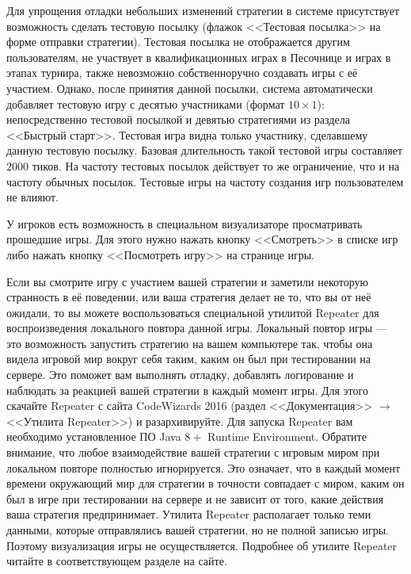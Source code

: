 Для упрощения отладки небольших изменений стратегии в системе присутствует возможность сделать тестовую посылку (флажок <<Тестовая посылка>>
на форме отправки стратегии). Тестовая посылка не отображается другим пользователям, не участвует в квалификационных играх в Песочнице и
играх в этапах турнира, также невозможно собственноручно создавать игры с её участием. Однако, после принятия данной посылки, система
автоматически добавляет тестовую игру с десятью участниками (формат $10\times1$): непосредственно тестовой посылкой и девятью стратегиями из
раздела <<Быстрый старт>>. Тестовая игра видна только участнику, сделавшему данную тестовую посылку. Базовая длительность такой тестовой
игры составляет $2000$ тиков. На частоту тестовых посылок действует то же ограничение, что и на частоту обычных посылок. Тестовые игры на
частоту создания игр пользователем не влияют.

У игроков есть возможность в специальном визуализаторе просматривать прошедшие игры. Для этого нужно нажать кнопку <<Смотреть>> в списке игр
либо нажать кнопку <<Посмотреть игру>> на странице игры.

Если вы смотрите игру с участием вашей стратегии и заметили некоторую странность в её поведении, или ваша стратегия делает не то, что вы от
неё ожидали, то вы можете воспользоваться специальной утилитой Repeater для воспроизведения локального повтора данной игры. Локальный повтор
игры --- это возможность запустить стратегию на вашем компьютере так, чтобы она видела игровой мир вокруг себя таким, каким он был при
тестировании на сервере. Это поможет вам выполнять отладку, добавлять логирование и наблюдать за реакцией вашей стратегии в каждый момент
игры. Для этого скачайте Repeater с сайта CodeWizards 2016 (раздел <<Документация>> $\rightarrow$ <<Утилита Repeater>>) и разархивируйте.
Для запуска Repeater вам необходимо установленное ПО Java $8+$ Runtime Environment. Обратите внимание, что любое взаимодействие вашей
стратегии с игровым миром при локальном повторе полностью игнорируется. Это означает, что в каждый момент времени окружающий мир для
стратегии в точности совпадает с миром, каким он был в игре при тестировании на сервере и не зависит от того, какие действия ваша стратегия
предпринимает. Утилита Repeater располагает только теми данными, которые отправлялись вашей стратегии, но не полной записью игры. Поэтому
визуализация игры не осуществляется. Подробнее об утилите Repeater читайте в соответствующем разделе на сайте.

